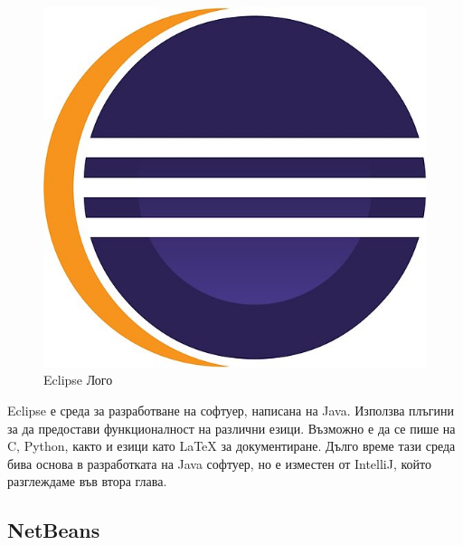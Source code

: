     \begin{figure}[h]
        \centering
        \includegraphics[scale=.2]{images/eclipse.jpg}
        \caption{Eclipse Лого}
        \label{fig:eclipse_logo}
    \end{figure}
    
    Eclipse е среда за разработване на софтуер, написана на Java. Използва плъгини за да предостави функционалност на различни езици. Възможно е да се пише на C, Python, както и езици като LaTeX за документиране. Дълго време тази среда бива основа в разработката на Java софтуер, но е изместен от IntelliJ, който разглеждаме във втора глава.

    \subsection{NetBeans}
    
